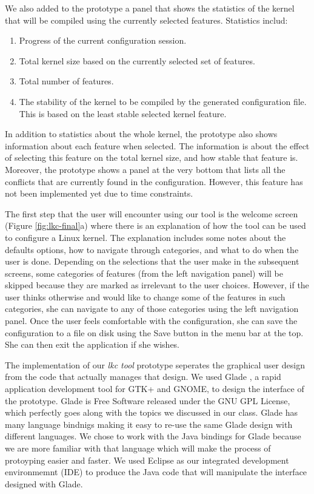 \documentclass{chi2009}
\begin{document}
We also added to the prototype a panel that shows the statistics of the kernel that will be compiled using the currently selected features. Statistics includ:
\begin{enumerate}
 \item Progress of the current configuration session.
 \item Total kernel size based on the currently selected set of features.
 \item Total number of features.
 \item The stability of the kernel to be compiled by the generated configuration file. This is based on the least stable selected kernel feature.
\end{enumerate}

In addition to statistics about the whole kernel, the prototype also shows information about each feature when selected. The information is about the effect
of selecting this feature on the total kernel size, and how stable that feature is. Moreover, the prototype shows a panel at the very bottom that lists all the
conflicts that are currently found in the configuration. However, this feature has not been implemented yet due to time constraints.

The first step that the user will encounter using our tool is the welcome screen (Figure \ref{fig:lkc-final}a) where there is an explanation of how the tool
can be used to configure a Linux kernel. The explanation includes some notes about the defaults options, how to navigate through categories, and what to do
when the user is done. Depending on the selections that the user make in the subsequent screens, some categories of features (from the left navigation panel)
will be skipped because they are marked as irrelevant to the user choices. However, if the user thinks otherwise and would like to change some of the features
in such categories, she can navigate to any of those categories using the left navigation panel. Once the user feels comfortable with the configuration, she
can save the configuration to a file on disk using the Save button in the menu bar at the top. She can then exit the application if she wishes.

The implementation of our \textit{lkc tool} prototype seperates the graphical user design from the code that actually manages that design. We used Glade
\cite{glade:2010}, a rapid application development tool for GTK+ and GNOME, to design the interface of the prototype. Glade is Free Software released under the
GNU GPL License, which perfectly goes along with the topics we discussed in our class. Glade has many language bindnigs making it easy to re-use the same Glade
design with different languages. We chose to work with the Java bindings for Glade \cite{java-gnome:2010} because we are more familiar with that language which
will make the process of protoyping easier and faster. We used Eclipse \cite{eclipse:2010} as our integrated development environmemnt (IDE) to produce the Java
code that will manipulate the interface designed with Glade.
\end{document}
